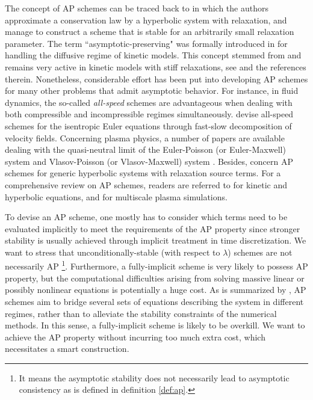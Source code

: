 \documentclass{report}
\begin{document}
 The concept of AP schemes can be traced back to \cite{jin_1995} in which the authors approximate a conservation law by a hyperbolic system with relaxation, and manage to construct a scheme that is stable for an arbitrarily small relaxation parameter. The term ``asymptotic-preserving" was formally introduced in \cite{jin_1999} for handling the diffusive regime of kinetic models. This concept stemmed from and remains very active in kinetic models with stiff relaxations, see \cite{jin_2010} and the references therein. Nonetheless, considerable effort has been put into developing AP schemes for many other problems that admit asymptotic behavior. For instance, in fluid dynamics, the so-called \emph{all-speed} schemes are advantageous when dealing with both compressible and incompressible regimes simultaneously. \cite{degond_2007, haack_2010} devise all-speed schemes for the isentropic Euler equations through fast-slow decomposition of velocity fields. Concerning plasma physics, a number of papers are available dealing with the quasi-neutral limit of the Euler-Poisson (or Euler-Maxwell) system \citep{crispel_2005, degond_2008, degond_2011, degond_2012} and Vlasov-Poisson (or Vlasov-Maxwell) system \citep{degond_2017, degond2017b, zhu_2017}. Besides, \cite{caflisch_1997, berthon2011} concern AP schemes for generic hyperbolic systems with relaxation source terms. For a comprehensive review on AP schemes, readers are referred to \cite{jin_2010} for kinetic and hyperbolic equations, and \cite{degond_2017} for multiscale plasma simulations. 
 
 To devise an AP scheme, one mostly has to consider which terms need to be evaluated implicitly to meet the requirements of the AP property \citep{degond_2011} since stronger stability is usually achieved through implicit treatment in time discretization. We want to stress that unconditionally-stable (with respect to $\lambda$) schemes are not necessarily AP \citep{degond_2011,caflisch_1997}\footnote{It means the asymptotic stability does not necessarily lead to asymptotic consistency as is defined in definition \ref{def:ap}.}. Furthermore, a fully-implicit scheme is very likely to possess AP property, but the computational difficulties arising from solving massive linear or possibly nonlinear equations is potentially a huge cost. As is summarized by \cite{degond_2017}, AP schemes aim to bridge several sets of equations describing the system in different regimes, rather than to alleviate the stability constraints of the numerical methods. In this sense, a fully-implicit scheme is likely to be overkill. We want to achieve the AP property without incurring too much extra cost, which necessitates a smart construction.    
 
\end{document}

